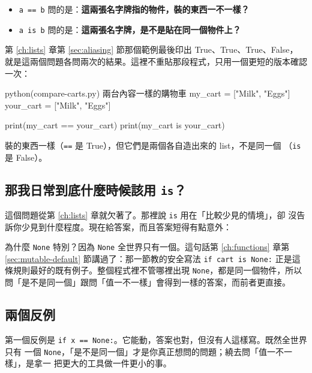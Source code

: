 \begin{itemize}
\item \texttt{a == b} 問的是：\textbf{這兩張名字牌指的物件，裝的東西一不一樣？}
\item \texttt{a is b} 問的是：\textbf{這兩張名字牌，是不是貼在同一個物件上？}
\end{itemize}

第 \ref{ch:lists} 章第 \ref{sec:aliasing} 節那個範例最後印出 True、True、True、False，
就是這兩個問題各問兩次的結果。這裡不重貼那段程式，只用一個更短的版本確認一次：

\begin{example}{python}{(compare-carts.py) 兩台內容一樣的購物車}
my_cart = ["Milk", "Eggs"]
your_cart = ["Milk", "Eggs"]

print(my_cart == your_cart)
print(my_cart is your_cart)
\end{example}


裝的東西一樣（\texttt{==} 是 True），但它們是兩個各自造出來的 list，不是同一個
（\texttt{is} 是 False）。

\subsection*{那我日常到底什麼時候該用 \texttt{is}？}

這個問題從第 \ref{ch:lists} 章就欠著了。那裡說 \texttt{is} 用在「比較少見的情境」，卻
沒告訴你少見到什麼程度。現在給答案，而且答案短得有點意外：


為什麼 \texttt{None} 特別？因為 \texttt{None} 全世界只有一個。這句話第 \ref{ch:functions}
章第 \ref{sec:mutable-default} 節講過了：那一節教的安全寫法 \texttt{if cart is None:}
正是這條規則最好的既有例子。整個程式裡不管哪裡出現 \texttt{None}，都是同一個物件，所以
問「是不是同一個」跟問「值一不一樣」會得到一樣的答案，而前者更直接。

\subsection*{兩個反例}

第一個反例是 \texttt{if x == None:}。它能動，答案也對，但沒有人這樣寫。既然全世界只有
一個 \texttt{None}，「是不是同一個」才是你真正想問的問題；繞去問「值一不一樣」，是拿一
把更大的工具做一件更小的事。

